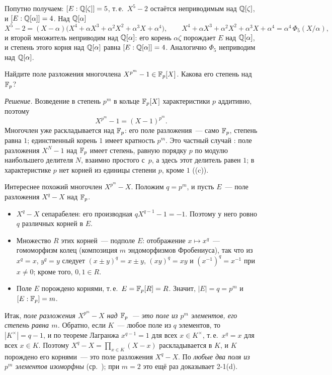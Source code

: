 Попутно получаем: $[E:\mathbb Q[\zeta]]=5$, т.\,е.\ $X^5-2$ остаётся неприводимым над $\mathbb Q[\zeta]$, и $[E:\mathbb Q[\alpha]]=4$. Над
$\mathbb Q[\alpha]$
\[
X^5-2=(X-\alpha)\bigl(X^4+\alpha X^3+\alpha^2X^2+\alpha^3X+\alpha^4\bigr),\qquad
X^4+\alpha X^3+\alpha^2X^2+\alpha^3X+\alpha^4=\alpha^4\,\Phi_5(X/\alpha),
\]
и второй множитель неприводим над $\mathbb Q[\alpha]$: его корень $\alpha\zeta$ порождает $E$ над $\mathbb Q[\alpha]$, и степень этого
корня над $\mathbb Q[\alpha]$ равна $[E:\mathbb Q[\alpha]]=4$. Аналогично $\Phi_5$ неприводим над $\mathbb Q[\alpha]$.

\begin{exercise}[2-4]
Найдите поле разложения многочлена $X^{p^m}-1\in\mathbb F_p[X]$. Какова его степень над $\mathbb F_p$?
\end{exercise}

\noindent\emph{Решение.} Возведение в степень $p^m$ в кольце $\mathbb F_p[X]$ характеристики $p$ аддитивно, поэтому
\[
X^{p^m}-1=(X-1)^{p^m}.
\]
Многочлен уже раскладывается над $\mathbb F_p$: его поле разложения~--- само $\mathbb F_p$, степень равна $1$; единственный корень $1$
имеет кратность $p^m$. Это частный случай : поле разложения $X^N-1$ над $\mathbb F_p$ имеет степень, равную порядку
$p$ по модулю наибольшего делителя $N$, взаимно простого с~$p$, а здесь этот делитель равен $1$; в характеристике $p$ нет корней из единицы степени
$p$, кроме $1$ ((c)).

Интереснее похожий многочлен $X^{p^m}-X$. Положим $q=p^m$, и пусть $E$~--- поле разложения $X^q-X$ над $\mathbb F_p$.
\begin{itemize}
\item $X^q-X$ сепарабелен: его производная $qX^{q-1}-1=-1$. Поэтому у него ровно $q$ различных корней в $E$.
\item Множество $R$ этих корней~--- подполе $E$: отображение $x\mapsto x^q$~--- гомоморфизм колец (композиция $m$
эндоморфизмов Фробениуса), так что из $x^q=x$, $y^q=y$ следует $(x\pm y)^q=x\pm y$, $(xy)^q=xy$ и
$(x^{-1})^q=x^{-1}$ при $x\ne0$; кроме того, $0,1\in R$.
\item Поле $E$ порождено корнями, т.\,е.\ $E=\mathbb F_p[R]=R$. Значит, $|E|=q=p^m$ и $[E:\mathbb F_p]=m$.
\end{itemize}
Итак, \emph{поле разложения $X^{p^m}-X$ над $\mathbb F_p$~--- это поле из $p^m$ элементов, его степень равна $m$.}
Обратно, если $K$~--- любое поле из $q$ элементов, то $|K^\times|=q-1$, и по теореме Лагранжа $x^{q-1}=1$ для всех
$x\in K^\times$, т.\,е.\ $x^q=x$ для всех $x\in K$. Поэтому $X^q-X=\prod_{x\in K}(X-x)$ раскладывается в $K$, и $K$
порождено его корнями~--- это поле разложения $X^q-X$. По  \emph{любые два поля из $p^m$ элементов изоморфны}
(ср.\ ); при $m=2$ это ещё раз доказывает 2-1(d).

